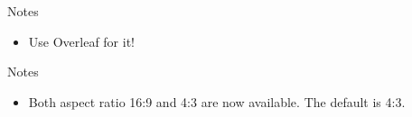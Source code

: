 \begin{frame}[fragile]{Notes}
    \begin{itemize}
        \item Use Overleaf for it!
    \end{itemize}
\end{frame}

\begin{frame}[fragile]{Notes}
    \begin{itemize}
        \item Both aspect ratio 16:9 and 4:3 are now available. The default is 4:3. 
    \end{itemize}
\end{frame}